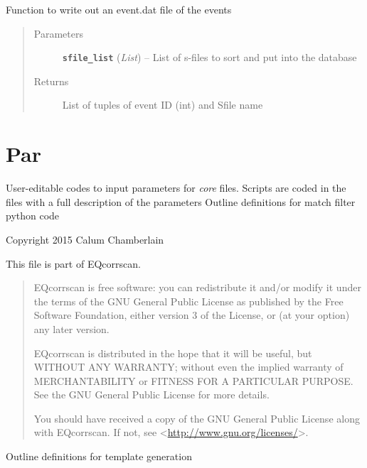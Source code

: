\documentclass[a4paper,10pt,english]{sphinxmanual}
\begin{document}

\begin{fulllineitems}
\label{utils:catalogue2DD.write_event}
Function to write out an event.dat file of the events
\begin{quote}\begin{description}
\item[{Parameters}] \leavevmode
\textbf{\texttt{sfile\_list}} (\emph{List}) -- List of s-files to sort and put into the database

\item[{Returns}] \leavevmode
List of tuples of event ID (int) and Sfile name

\end{description}\end{quote}

\end{fulllineitems}



\section{Par}
\label{par:par}\label{par::doc}
User-editable codes to input parameters for \emph{core} files.
Scripts are coded in the files with a full description of the parameters
\label{par:module-match_filter_par}
Outline definitions for match filter python code

Copyright 2015 Calum Chamberlain

This file is part of EQcorrscan.
\begin{quote}

EQcorrscan is free software: you can redistribute it and/or modify
it under the terms of the GNU General Public License as published by
the Free Software Foundation, either version 3 of the License, or
(at your option) any later version.

EQcorrscan is distributed in the hope that it will be useful,
but WITHOUT ANY WARRANTY; without even the implied warranty of
MERCHANTABILITY or FITNESS FOR A PARTICULAR PURPOSE.  See the
GNU General Public License for more details.

You should have received a copy of the GNU General Public License
along with EQcorrscan.  If not, see \textless{}\href{http://www.gnu.org/licenses/}{http://www.gnu.org/licenses/}\textgreater{}.
\end{quote}
\label{par:module-template_gen_par}
Outline definitions for template generation
\end{document}
